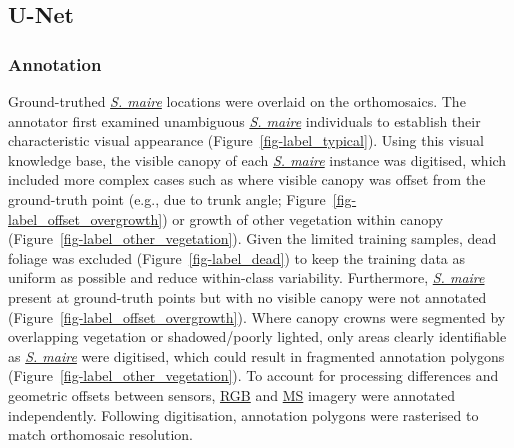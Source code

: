 \documentclass[
]{scrreprt}
\begin{document}
\subsection{U-Net}\label{u-net}

\subsubsection{Annotation}\label{annotation}

Ground-truthed \hyperref[acronyms_SM]{\emph{S. maire}} locations were
overlaid on the orthomosaics. The annotator first examined unambiguous
\hyperref[acronyms_SM]{\emph{S. maire}} individuals to establish their
characteristic visual appearance (Figure~\ref{fig-label_typical}). Using
this visual knowledge base, the visible canopy of each
\hyperref[acronyms_SM]{\emph{S. maire}} instance was digitised, which
included more complex cases such as where visible canopy was offset from
the ground-truth point (e.g., due to trunk angle;
Figure~\ref{fig-label_offset_overgrowth}) or growth of other vegetation
within canopy (Figure~\ref{fig-label_other_vegetation}). Given the
limited training samples, dead foliage was excluded
(Figure~\ref{fig-label_dead}) to keep the training data as uniform as
possible and reduce within-class variability. Furthermore,
\hyperref[acronyms_SM]{\emph{S. maire}} present at ground-truth points
but with no visible canopy were not annotated
(Figure~\ref{fig-label_offset_overgrowth}). Where canopy crowns were
segmented by overlapping vegetation or shadowed/poorly lighted, only
areas clearly identifiable as \hyperref[acronyms_SM]{\emph{S. maire}}
were digitised, which could result in fragmented annotation polygons
(Figure~\ref{fig-label_other_vegetation}). To account for processing
differences and geometric offsets between sensors,
\hyperref[acronyms_RGB]{RGB} and \hyperref[acronyms_MS]{MS} imagery were
annotated independently. Following digitisation, annotation polygons
were rasterised to match orthomosaic resolution.
\end{document}
